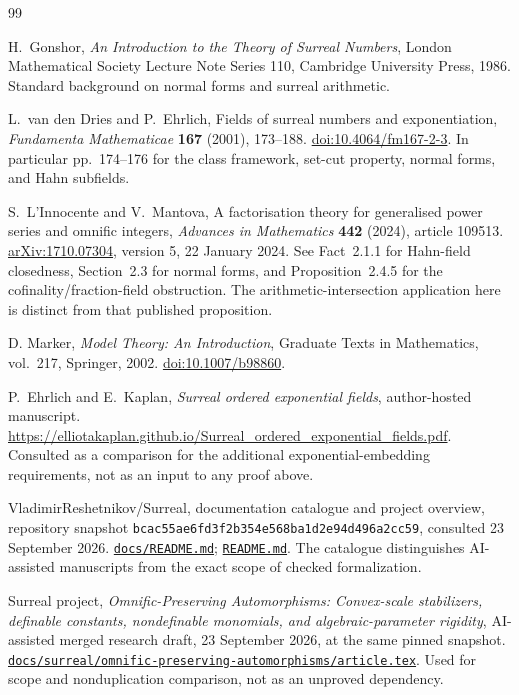 \documentclass[11pt,letterpaper]{article}
\theoremstyle{definition}
\theoremstyle{remark}
\newcommand{\snapshot}{\texttt{bcac55ae6fd3f2b354e568ba1d2e94d496a2cc59}}
\newcommand{\repo}[1]{\href{https://github.com/VladimirReshetnikov/Surreal/blob/bcac55ae6fd3f2b354e568ba1d2e94d496a2cc59/#1}{\nolinkurl{#1}}}
\numberwithin{equation}{section}
\begin{document}
\begin{thebibliography}{99}

H.~Gonshor, \emph{An Introduction to the Theory of Surreal Numbers},
London Mathematical Society Lecture Note Series 110, Cambridge University
Press, 1986. Standard background on normal forms and surreal arithmetic.

L.~van den Dries and P.~Ehrlich, Fields of surreal numbers and
exponentiation, \emph{Fundamenta Mathematicae} \textbf{167} (2001), 173--188.
\href{https://doi.org/10.4064/fm167-2-3}{doi:10.4064/fm167-2-3}.
In particular pp.~174--176 for the class framework, set-cut property,
normal forms, and Hahn subfields.

S.~L'Innocente and V.~Mantova, A factorisation theory for generalised power
series and omnific integers, \emph{Advances in Mathematics} \textbf{442}
(2024), article 109513.
\href{https://arxiv.org/abs/1710.07304}{arXiv:1710.07304}, version 5,
22 January 2024. See Fact~2.1.1 for Hahn-field closedness, Section~2.3 for
normal forms, and Proposition~2.4.5 for the cofinality/fraction-field
obstruction. The arithmetic-intersection application here is distinct from
that published proposition.

D. Marker, \emph{Model Theory: An Introduction},
Graduate Texts in Mathematics, vol.~217, Springer, 2002.
\href{https://doi.org/10.1007/b98860}{doi:10.1007/b98860}.

P.~Ehrlich and E.~Kaplan, \emph{Surreal ordered exponential fields},
author-hosted manuscript.
\url{https://elliotakaplan.github.io/Surreal_ordered_exponential_fields.pdf}.
Consulted as a comparison for the additional exponential-embedding
requirements, not as an input to any proof above.

VladimirReshetnikov/Surreal, documentation catalogue and project overview,
repository snapshot \snapshot, consulted 23 September 2026.
\repo{docs/README.md}; \repo{README.md}.
The catalogue distinguishes AI-assisted manuscripts from the exact scope
of checked formalization.

Surreal project, \emph{Omnific-Preserving Automorphisms: Convex-scale
stabilizers, definable constants, nondefinable monomials, and
algebraic-parameter rigidity}, AI-assisted merged research draft,
23 September 2026, at the same pinned snapshot.
\repo{docs/surreal/omnific-preserving-automorphisms/article.tex}.
Used for scope and nonduplication comparison, not as an unproved dependency.


\end{thebibliography}
\end{document}

